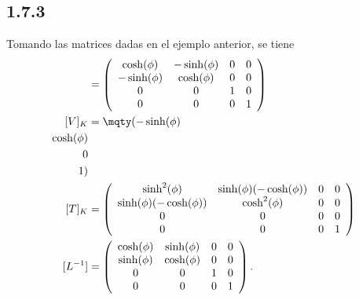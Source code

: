 \subsection{1.7.3}
Tomando las matrices dadas en el ejemplo anterior, se tiene
\begin{align*}
	[L] &= \left(
	\begin{array}{cccc}
		 \cosh (\phi) & -\sinh (\phi) & 0 & 0 \\
		 -\sinh (\phi) & \cosh (\phi) & 0 & 0 \\
		 0 & 0 & 1 & 0 \\
		 0 & 0 & 0 & 1 \\
	\end{array}
	\right) \\
	[V]_K &= \mqty(-\sinh (\phi) \\ \cosh (\phi)\\ 0\\ 1) \\
	[T]_K &= \left(
		\begin{array}{cccc}
			 \sinh ^2(\phi) & \sinh (\phi) (-\cosh (\phi)) & 0 & 0 \\
			 \sinh (\phi) (-\cosh (\phi)) & \cosh ^2(\phi) & 0 & 0 \\
			 0 & 0 & 0 & 0 \\
			 0 & 0 & 0 & 1 \\
		\end{array}
		\right)  \\
	[L^{-1}] &= \left(
		\begin{array}{cccc}
			 \cosh (\phi) & \sinh (\phi) & 0 & 0 \\
			 \sinh (\phi) & \cosh (\phi) & 0 & 0 \\
			 0 & 0 & 1 & 0 \\
			 0 & 0 & 0 & 1 \\
		\end{array}
		\right) .
\end{align*}
	
